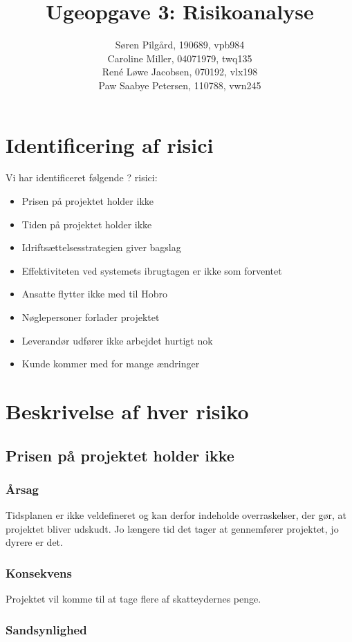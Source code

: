 \documentclass[10pt,a4paper,danish]{article}
\title{Ugeopgave 3: Risikoanalyse}
\author{Søren Pilgård, 190689, vpb984\\
Caroline Miller, 04071979, twq135\\
René Løwe Jacobsen, 070192, vlx198\\
Paw Saabye Petersen, 110788, vwn245}
\begin{document}
\maketitle
\newpage


\section{Identificering af risici}
Vi har identificeret følgende ? risici:
\begin{itemize}
\item Prisen på projektet holder ikke
\item Tiden på projektet holder ikke
\item Idriftsættelsesstrategien giver bagslag
\item Effektiviteten ved systemets ibrugtagen er ikke som forventet
\item Ansatte flytter ikke med til Hobro 
\item Nøglepersoner forlader projektet
\item Leverandør udfører ikke arbejdet hurtigt nok
\item Kunde kommer med for mange ændringer
\end{itemize}

\section{Beskrivelse af hver risiko}
\subsection{Prisen på projektet holder ikke}
\subsubsection{Årsag}
Tidsplanen er ikke veldefineret og kan derfor indeholde overraskelser, der gør, at projektet bliver udskudt. Jo længere tid det tager at gennemfører projektet, jo dyrere er det.
\subsubsection{Konsekvens}
Projektet vil komme til at tage flere af skatteydernes penge.
\subsubsection{Sandsynlighed}
\end{document}
